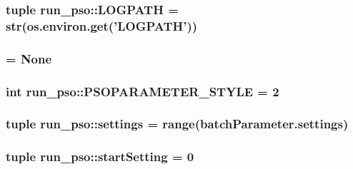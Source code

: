 \hypertarget{namespacerun__pso_d0daedc626a37bceecf7e1fbf606745e}{
\subsubsection{\setlength{\rightskip}{0pt plus 5cm}tuple {\bf run\_\-pso::LOGPATH} = str(os.environ.get('{\bf LOGPATH}'))}}
\label{namespacerun__pso_d0daedc626a37bceecf7e1fbf606745e}


\hypertarget{namespacerun__pso_2f4a1650b61fc98aaa1474f8e6631576}{
\subsubsection{ = None}}
\label{namespacerun__pso_2f4a1650b61fc98aaa1474f8e6631576}


\hypertarget{namespacerun__pso_26666bbfc1f7ff2946e8d188dfac7428}{
\subsubsection{\setlength{\rightskip}{0pt plus 5cm}int {\bf run\_\-pso::PSOPARAMETER\_\-STYLE} = 2}}
\label{namespacerun__pso_26666bbfc1f7ff2946e8d188dfac7428}


\hypertarget{namespacerun__pso_afcb884aafce4dc8868b132676c64b3b}{
\subsubsection{\setlength{\rightskip}{0pt plus 5cm}tuple {\bf run\_\-pso::settings} = range(batchParameter.settings)}}
\label{namespacerun__pso_afcb884aafce4dc8868b132676c64b3b}


\hypertarget{namespacerun__pso_52030e9fb4d89dac00b30077913c9865}{
\subsubsection{\setlength{\rightskip}{0pt plus 5cm}tuple {\bf run\_\-pso::startSetting} = 0}}
\label{namespacerun__pso_52030e9fb4d89dac00b30077913c9865}


